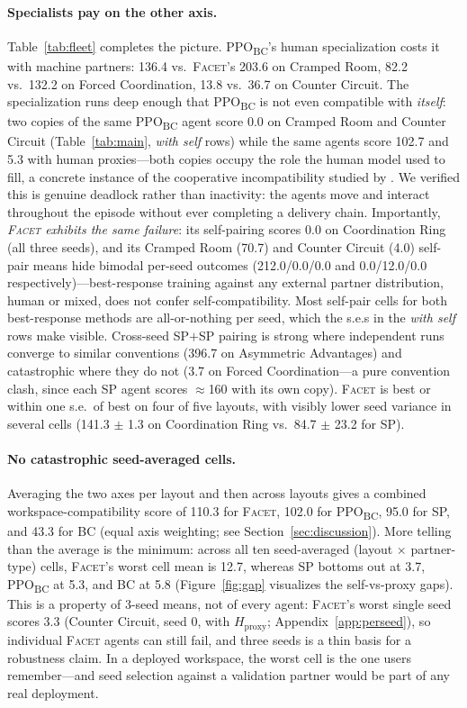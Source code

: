 \documentclass[11pt]{article}
\newcommand{\facet}{\textsc{Facet}}
\newcommand{\hproxy}{$H_{\text{proxy}}$}
\newcommand{\ppobc}{PPO\textsubscript{BC}}
\begin{document}
\paragraph{Specialists pay on the other axis.}
Table~\ref{tab:fleet} completes the picture. \ppobc{}'s human
specialization costs it with machine partners: 136.4 vs.\ \facet{}'s 203.6
on Cramped Room, 82.2 vs.\ 132.2 on Forced Coordination, 13.8 vs.\ 36.7 on
Counter Circuit. The specialization runs deep enough that \ppobc{} is not
even compatible with \emph{itself}: two copies of the same \ppobc{} agent
score 0.0 on Cramped Room and Counter Circuit (Table~\ref{tab:main},
\emph{with self} rows) while the same agents score 102.7 and 5.3 with human
proxies---both copies occupy the role the human model used to fill, a
concrete instance of the cooperative incompatibility studied by
\citet{li2023cooperative}. We verified this is genuine deadlock rather than
inactivity: the agents move and interact throughout the episode without
ever completing a delivery chain. Importantly, \emph{\facet{} exhibits the
same failure}: its self-pairing scores 0.0 on Coordination Ring (all three
seeds), and its Cramped Room (70.7) and Counter Circuit (4.0) self-pair
means hide bimodal per-seed outcomes (212.0/0.0/0.0 and 0.0/12.0/0.0
respectively)---best-response training against any external partner
distribution, human or mixed, does not confer self-compatibility. Most
self-pair cells for both best-response methods are all-or-nothing per
seed, which the s.e.s in the \emph{with self} rows make visible. Cross-seed SP$+$SP pairing is strong where independent
runs converge to similar conventions (396.7 on Asymmetric Advantages) and
catastrophic where they do not (3.7 on Forced Coordination---a pure
convention clash, since each SP agent scores $\approx$160 with its own
copy). \facet{} is best or within one s.e.\ of best on four of five
layouts, with visibly lower seed variance in several cells
(141.3 $\pm$ 1.3 on Coordination Ring vs.\ 84.7 $\pm$ 23.2 for SP).

\paragraph{No catastrophic seed-averaged cells.}
Averaging the two axes per layout and then across layouts gives a combined
workspace-compatibility score of 110.3 for \facet{}, 102.0 for \ppobc{},
95.0 for SP, and 43.3 for BC (equal axis weighting; see
Section~\ref{sec:discussion}). More telling than the average is the
minimum: across all ten seed-averaged (layout $\times$ partner-type)
cells, \facet{}'s worst cell mean is 12.7, whereas SP bottoms out at 3.7,
\ppobc{} at 5.3, and BC at 5.8 (Figure~\ref{fig:gap} visualizes the
self-vs-proxy gaps). This is a property of 3-seed means, not of every
agent: \facet{}'s worst single seed scores 3.3 (Counter Circuit, seed 0,
with \hproxy{}; Appendix~\ref{app:perseed}), so individual \facet{} agents
can still fail, and three seeds is a thin basis for a robustness claim.
In a deployed workspace, the worst cell is the one users remember---and
seed selection against a validation partner would be part of any real
deployment.
\end{document}
